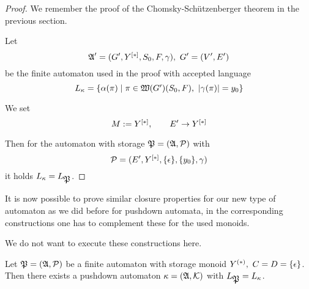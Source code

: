 \begin{proof}
We remember the proof of the Chomsky-Schützenberger theorem in the previous
section.

Let
\[ \mbox{$\mathfrak{A}$}'=(G', \mbox{${Y}^{[*]}$}, S_0, F, \gamma),\ G'=(V',E') \]
be the finite automaton used in the proof with accepted language
\[ L_\kappa = \mbox{$\{\alpha(\pi) \mid \pi \in \mbox{$\mathfrak{W}(G')$}(S_0,F),\
|\gamma(\pi)|=y_0\}$} \]

We set
\[ M := \mbox{${Y}^{[*]}$},\qquad E' \to \mbox{${Y}^{[*]}$} \]

Then for the automaton with storage $\mbox{$\mathfrak{P}$}=(\mbox{$\mathfrak{A}$}, \mbox{$\mathcal{P}$})$ with 
\[ \mbox{$\mathcal{P}$} = (E', \mbox{${Y}^{[*]}$}, \mbox{$\{\epsilon\}$}, \mbox{$\{y_0\}$}, \gamma) \]
it holds $L_\kappa = L_{\mbox{$\mathfrak{P}$}}$.
\end{proof}

\bigskip
It is now possible to prove similar closure properties for our new type of
automaton as we did before for pushdown automata, in the corresponding
constructions one has to complement these for the used monoids.

We do not want to execute these constructions here.

\bigskip
\begin{theorem}[]
Let $\mbox{$\mathfrak{P}$}=(\mbox{$\mathfrak{A}$}, \mbox{$\mathcal{P}$})$ be a finite automaton with storage monoid
$\mbox{${Y}^{(*)}$},\ C = D = \mbox{$\{\epsilon\}$}$. Then there exists a pushdown automaton
$\kappa = (\mbox{$\mathfrak{A}$}, \mbox{$\mathcal{K}$})$ with $L_{\mbox{$\mathfrak{P}$}} = L_\kappa$.
\end{theorem}

